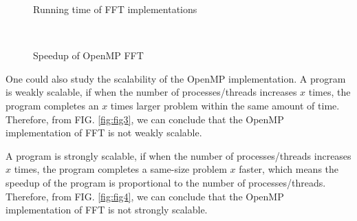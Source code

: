 \documentclass[amsmath,amssymb]{revtex4}
\begin{document}
\begin{figure}[h]
  \centering
  \begin{minipage}[b]{0.45\textwidth}

\caption{\label{fig:fig1}Running time of FFT implementations}
\end{minipage}
~
\begin{minipage}[b]{0.45\textwidth}
\caption{\label{fig:fig2}Speedup of OpenMP FFT}
\end{minipage}
\end{figure}

One could also study the scalability of the OpenMP implementation. A program is weakly scalable, if when the number of processes/threads increases $x$ times, the program completes an $x$ times larger problem within the same amount of time. Therefore, from FIG. \ref{fig:fig3}, we can conclude that the OpenMP implementation of FFT is not weakly scalable.

A program is strongly scalable, if when the number of processes/threads increases $x$ times, the program completes a same-size problem $x$ faster, which means the speedup of the program is proportional to the number of processes/threads. Therefore, from FIG. \ref{fig:fig4}, we can conclude that the OpenMP implementation of FFT is not strongly scalable.
\end{document}
